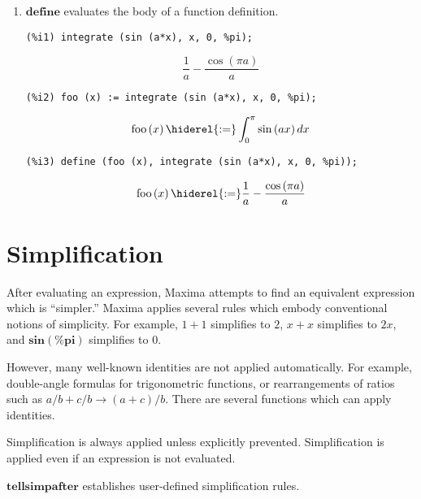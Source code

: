 \documentclass[12pt,leqno]{article}
\begin{document}
\begin{enumerate}
\item $\mathbf{define}$ evaluates the body of a function definition.
\begin{verbatim}
(%i1) integrate (sin (a*x), x, 0, %pi);
\end{verbatim}
\begin{dmath}[number={\(\mathop{\mathrm{\%o}_{1}}\)}]
\frac{1}{a}-\frac{\cos \left(\pi a\right)}{a}
\end{dmath}
\begin{verbatim}
(%i2) foo (x) := integrate (sin (a*x), x, 0, %pi);
\end{verbatim}
\begin{dmath}[number={\(\mathop{\mathrm{\%o}_{2}}\)}]
\mathop{\mathrm{foo}}\left(x\right) \hiderel{:=} \int_{0}^{\pi}\sin \left(a x\right)\mathop{dx}
\end{dmath}
\begin{verbatim}
(%i3) define (foo (x), integrate (sin (a*x), x, 0, %pi));
\end{verbatim}
\begin{dmath}[number={\(\mathop{\mathrm{\%o}_{3}}\)}]
\mathop{\mathrm{foo}}\left(x\right) \hiderel{:=} \frac{1}{a}-\frac{\cos \left(\pi a\right)}{a}
\end{dmath}


\end{enumerate}

\section{Simplification}

After evaluating an expression,
Maxima attempts to find an equivalent expression which is ``simpler.''
Maxima applies several rules which embody conventional notions of simplicity.
For example,
$1 + 1$ simplifies to $2$,
$x + x$ simplifies to $2 x$,
and $\mathbf{sin}(\mathbf{\%pi})$ simplifies to $0$.

However,
many well-known identities are not applied automatically.
For example,
double-angle formulas for trigonometric functions,
or rearrangements of ratios such as $a/b + c/b \rightarrow (a + c)/b$.
There are several functions which can apply identities.

Simplification is always applied unless explicitly prevented.
Simplification is applied even if an expression is not evaluated.

$\mathbf{tellsimpafter}$ establishes user-defined simplification rules.
\end{document}
